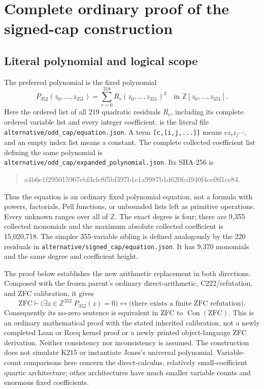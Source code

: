 \section{Complete ordinary proof of the signed-cap construction}
\label{sec:direct-signed-cap-full}

\subsection{Literal polynomial and logical scope}
The preferred polynomial is the fixed polynomial
\[
 P_{352}(z_0,\ldots,z_{351})
   =\sum_{r=0}^{218} R_r(z_0,\ldots,z_{351})^2
   \quad\text{in }\mathbb Z[z_0,\ldots,z_{351}].
\]
Here the ordered list of all 219 quadratic residuals $R_r$, including
its complete ordered variable list and every integer coefficient, is the
literal file \texttt{alternative/odd\_cap/equation.json}. A term
\texttt{[c,[i,j,...]]} means $c z_i z_j\cdots$, and an empty index list
means a constant. The complete collected coefficient list defining the
same polynomial is
\texttt{alternative/odd\_cap/expanded\_polynomial.json}. Its SHA-256 is
\begin{quote}\small\ttfamily
 a4b6e1f295015967ebf3cfe8f5bf397b1e1a9987b1d620fcd940f4cef8f1ce84.
\end{quote}
Thus the equation is an ordinary fixed polynomial equation, not a formula
with powers, factorials, Pell functions, or unbounded lists left as
primitive operations. Every unknown ranges over all of $\mathbb Z$.
The exact degree is four; there are 9,355 collected monomials and the
maximum absolute collected coefficient is 15,020,718. The simpler
355-variable sibling is defined analogously by the 220 residuals in
\texttt{alternative/signed\_cap/equation.json}. It has 9,370 monomials
and the same degree and coefficient height.

The proof below establishes the new arithmetic replacement in both
directions. Composed with the frozen parent's ordinary direct-arithmetic,
C222/refutation, and ZFC calibration, it gives
\[
 \mathrm{ZFC}\vdash
 \bigl(\exists z\in\mathbb Z^{352}\;P_{352}(z)=0\bigr)
 \longleftrightarrow
 \bigl(\text{there exists a finite ZFC refutation}\bigr).
\]
Consequently its no-zero sentence is equivalent in ZFC to
$\operatorname{Con}(\mathrm{ZFC})$. This is an ordinary mathematical
proof with the stated inherited calibration, not a newly completed
Lean or Rocq kernel proof or a newly printed object-language ZFC
derivation. Neither consistency nor inconsistency is assumed. The
construction does not simulate K215 or instantiate Jones's universal
polynomial. Variable-count comparisons here concern the direct-calculus,
relatively small-coefficient quartic architecture; other architectures
have much smaller variable counts and enormous fixed coefficients.

